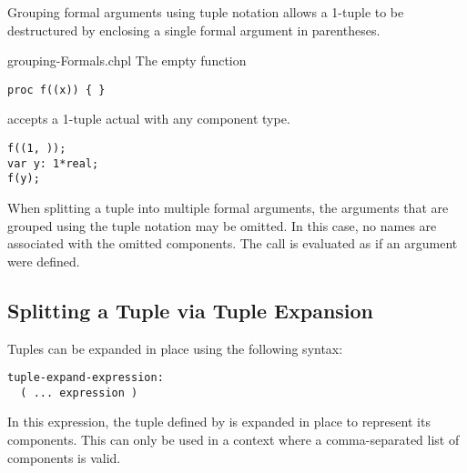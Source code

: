 Grouping formal arguments using tuple notation allows a 1-tuple to be
destructured by enclosing a single formal argument in parentheses.
\begin{chapelexample}{grouping-Formals.chpl}
The empty function
\begin{chapel}
\begin{verbatim}
proc f((x)) { }
\end{verbatim}
\end{chapel}
accepts a 1-tuple actual with any component type.
\begin{chapelpost}
\begin{verbatim}
f((1, ));
var y: 1*real;
f(y);
\end{verbatim}
\end{chapelpost}
\end{chapelexample}

When splitting a tuple into multiple formal arguments, the arguments
that are grouped using the tuple notation may be omitted.  In this
case, no names are associated with the omitted components.  The
call is evaluated as if an argument were defined.

\subsection{Splitting a Tuple via Tuple Expansion}
\label{Tuple_Expansion}

Tuples can be expanded in place using the following syntax:
\begin{syntax}
\begin{verbatim}
tuple-expand-expression:
  ( ... expression )
\end{verbatim}
\end{syntax}
In this expression, the tuple defined by  is expanded
in place to represent its components.  This can only be used in a
context where a comma-separated list of components is valid.

